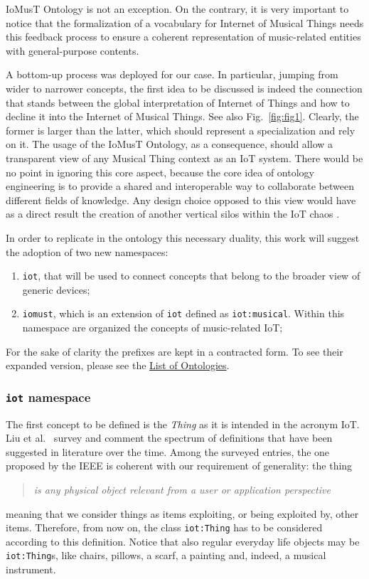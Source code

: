 IoMusT Ontology is not an exception. On the contrary, it is very important to notice that the formalization of a vocabulary for Internet of Musical Things needs this feedback process to ensure a coherent representation of music-related entities with general-purpose contents. 

A bottom-up process was deployed for our case. In particular, jumping from wider to narrower concepts, the first idea to be discussed is indeed the connection that stands between the global interpretation of Internet of Things and how to decline it into the Internet of Musical Things. See also Fig.~\ref{fig:fig1}. Clearly, the former is larger than the latter, which should represent a specialization and rely on it. The usage of the IoMusT Ontology, as a consequence, should allow a transparent view of any Musical Thing context as an IoT system. There would be no point in ignoring this core aspect, because the core idea of ontology engineering is to provide a shared and interoperable way to collaborate between different fields of knowledge. Any design choice opposed to this view would have as a direct result the creation of another vertical silos within the IoT chaos \cite{broring2017enabling}.

In order to replicate in the ontology this necessary duality, this work will suggest the adoption of two new namespaces:
\begin{enumerate}
    \item \texttt{iot}, that will be used to connect concepts that belong to the broader view of generic devices;
    \item \texttt{iomust}, which is an extension of \texttt{iot} defined as \texttt{iot:musical}. Within this namespace are organized the concepts of music-related IoT;
\end{enumerate}

For the sake of clarity the prefixes are kept in a contracted form. To see their expanded version, please see the \hyperref[sec:ontology_list]{List of Ontologies}.

\subsubsection{\texttt{iot} \textsf{namespace}}

The first concept to be defined is the \textit{Thing} as it is intended in the acronym IoT. Liu et al.~\cite{liu2016comparison} survey and comment the spectrum of definitions that have been suggested in literature over the time. Among the surveyed entries, the one proposed by the IEEE is coherent with our requirement of generality: the thing 
\begin{quote}
\textit{is any physical object relevant from a user or application perspective}
\end{quote} 
meaning that we consider things as items exploiting, or being exploited by, other items. Therefore, from now on, the class \texttt{iot:Thing} has to be considered according to this definition. Notice that also regular everyday life objects may be \texttt{iot:Thing}s, like chairs, pillows, a scarf, a painting and, indeed, a musical instrument.

